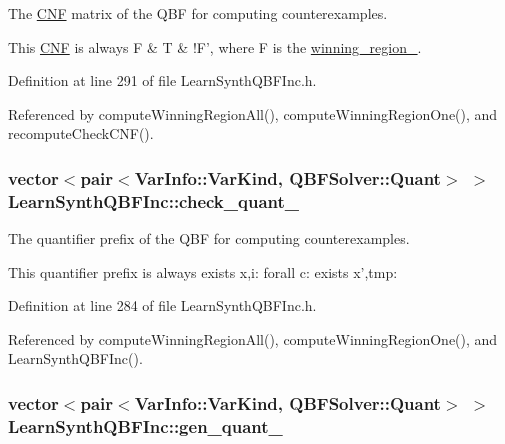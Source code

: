 The \hyperlink{classCNF}{C\-N\-F} matrix of the Q\-B\-F for computing counterexamples. 

This \hyperlink{classCNF}{C\-N\-F} is always F \& T \& !\-F', where F is the \hyperlink{classLearnSynthQBFInc_abc3503bdb6be7053a7c3d3d7e57858d6}{winning\-\_\-region\-\_\-}. 

Definition at line 291 of file Learn\-Synth\-Q\-B\-F\-Inc.\-h.



Referenced by compute\-Winning\-Region\-All(), compute\-Winning\-Region\-One(), and recompute\-Check\-C\-N\-F().

\hypertarget{classLearnSynthQBFInc_a1430ac66d026f9e3f30619082f378426}{
\subsubsection[{check\-\_\-quant\-\_\-}]{\setlength{\rightskip}{0pt plus 5cm}vector$<$pair$<${\bf Var\-Info\-::\-Var\-Kind}, {\bf Q\-B\-F\-Solver\-::\-Quant}$>$ $>$ Learn\-Synth\-Q\-B\-F\-Inc\-::check\-\_\-quant\-\_\-\hspace{0.3cm}{\ttfamily [protected]}}}\label{classLearnSynthQBFInc_a1430ac66d026f9e3f30619082f378426}


The quantifier prefix of the Q\-B\-F for computing counterexamples. 

This quantifier prefix is always exists x,i\-: forall c\-: exists x',tmp\-: 

Definition at line 284 of file Learn\-Synth\-Q\-B\-F\-Inc.\-h.



Referenced by compute\-Winning\-Region\-All(), compute\-Winning\-Region\-One(), and Learn\-Synth\-Q\-B\-F\-Inc().

\hypertarget{classLearnSynthQBFInc_af42c16902cfccdf51d1c1bc112be0ee4}{
\subsubsection[{gen\-\_\-quant\-\_\-}]{\setlength{\rightskip}{0pt plus 5cm}vector$<$pair$<${\bf Var\-Info\-::\-Var\-Kind}, {\bf Q\-B\-F\-Solver\-::\-Quant}$>$ $>$ Learn\-Synth\-Q\-B\-F\-Inc\-::gen\-\_\-quant\-\_\-\hspace{0.3cm}{\ttfamily [protected]}}}\label{classLearnSynthQBFInc_af42c16902cfccdf51d1c1bc112be0ee4}


